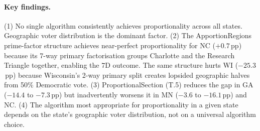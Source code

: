 \paragraph{Key findings.}
(1) No single algorithm consistently achieves proportionality across all states.
Geographic voter distribution is the dominant factor.
(2) The ApportionRegions prime-factor structure achieves near-perfect proportionality
for NC ($+0.7$\,pp) because its 7-way primary factorisation groups Charlotte and the
Research Triangle together, enabling the 7D outcome.
The same structure hurts WI ($-25.3$\,pp) because Wisconsin's 2-way primary split
creates lopsided geographic halves from 50\% Democratic vote.
(3) ProportionalSection (T.5) reduces the gap in GA ($-14.4$ to $-7.3$\,pp) but
inadvertently worsens it in MN ($-3.6$ to $-16.1$\,pp) and NC.
(4) The algorithm most appropriate for proportionality in a given state depends on
the state's geographic voter distribution, not on a universal algorithm choice.
